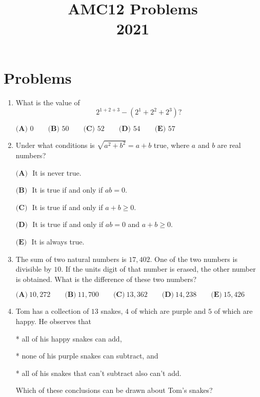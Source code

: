 \documentclass{article}
\title{AMC12 Problems \\ 2021}
\date{}
\begin{document}
\maketitle\thispagestyle{fancy}\newpage\section*{Problems}\begin{enumerate}[label=\arabic*., itemsep=0.5em]\item What is the value of
\begin{equation*}
2^{1+2+3}-(2^1+2^2+2^3)?
\end{equation*}

$\textbf{(A) }0 \qquad \textbf{(B) }50 \qquad \textbf{(C) }52 \qquad \textbf{(D) }54 \qquad \textbf{(E) }57$\par \vspace{0.5em}\item Under what conditions is $\sqrt{a^2+b^2}=a+b$ true, where $a$ and $b$ are real numbers?

$\textbf{(A) }$ It is never true.

$\textbf{(B) }$ It is true if and only if $ab=0$.

$\textbf{(C) }$ It is true if and only if $a+b\ge 0$.

$\textbf{(D) }$ It is true if and only if $ab=0$ and $a+b\ge 0$.

$\textbf{(E) }$ It is always true.\par \vspace{0.5em}\item The sum of two natural numbers is $17{,}402$. One of the two numbers is divisible by $10$. If the units digit of that number is erased, the other number is obtained. What is the difference of these two numbers?

$\textbf{(A)} ~10{,}272\qquad\textbf{(B)} ~11{,}700\qquad\textbf{(C)} ~13{,}362\qquad\textbf{(D)} ~14{,}238\qquad\textbf{(E)} ~15{,}426$\par \vspace{0.5em}\item Tom has a collection of $13$ snakes, $4$ of which are purple and $5$ of which are happy. He observes that

* all of his happy snakes can add,

* none of his purple snakes can subtract, and

* all of his snakes that can't subtract also can't add.

Which of these conclusions can be drawn about Tom's snakes?


\end{enumerate}
\end{document}
